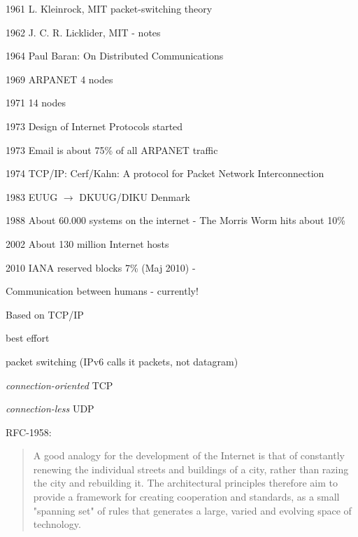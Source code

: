 \documentclass[Screen16to9,17pt]{foils}
\begin{document}
\begin{list2}
\item[1961]  L. Kleinrock, MIT packet-switching theory
\item[1962]  J. C. R. Licklider, MIT - notes
\item[1964]  Paul Baran: On Distributed Communications
\item[1969]  ARPANET 4 nodes
\item[1971]  14 nodes
\item[1973]  Design of Internet Protocols started
\item[1973]  Email is about 75\% of all ARPANET traffic
\item[1974]  TCP/IP: Cerf/Kahn: A protocol for Packet
        Network Interconnection
\item[1983]  EUUG $\rightarrow$ DKUUG/DIKU Denmark
\item[1988]  About 60.000 systems on the internet -
        The Morris Worm hits about 10\%
\item[2002] About 130 million Internet hosts
\item[2010] IANA reserved blocks 7\% (Maj 2010) - 
\end{list2}



\begin{list1}
\item Communication between humans - currently!
\item Based on TCP/IP
\begin{list2}
\item best effort
\item packet switching (IPv6 calls it packets, not datagram)
\item \emph{connection-oriented} TCP
\item \emph{connection-less} UDP
\end{list2}
\end{list1}

RFC-1958:
\begin{quote}
 A good analogy for the development of the Internet is that of
 constantly renewing the individual streets and buildings of a city,
 rather than razing the city and rebuilding it. The architectural
 principles therefore aim to provide a framework for creating
 cooperation and standards, as a small "spanning set" of rules that
 generates a large, varied and evolving space of technology.
\end{quote}
\end{document}
